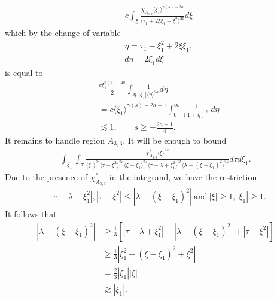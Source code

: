 \documentclass[12pt,reqno]{amsart}
\numberwithin{equation}{section}  %
\begin{document}
\begin{equation*}
\begin{split}
  &  c
  \int_{\xi} \frac{\chi_{A_{3,2}} \langle \xi_{1} \rangle ^{\gamma(s) -2a}}{\langle
  \tau_{1} + 2 \xi \xi_{1} - \xi_{1}^{2} \rangle^{2b}} d \xi
\end{split}
\end{equation*}
which by the change of variable
%
%
\begin{equation*}
\begin{split}
  & \eta = \tau_{1} - \xi_{1}^{2} + 2 \xi \xi_{1},
  \\
  & d \eta = 2 \xi_{1} d \xi
\end{split}
\end{equation*}
%
%
is equal to
%
%
\begin{equation*}
\begin{split}
  & \frac{c \xi_{1}^{\gamma(s) -2a}}{2}  \int_{\eta} 
  \frac{1}{| \xi_{1} |\langle \eta \rangle ^{2a}}d \eta
  \\
  & = c\langle \xi_{1} \rangle ^{\gamma(s) -2a -1} \int_{0}^{\infty} \frac{1}{(1 + \eta
  )^{2a}}d \eta
  \\
  & \lesssim 1, \qquad s \ge -\frac{2a+1}{4}.
\end{split}
\end{equation*}
It remains to handle region $A_{3,3}$. It will be enough to bound
%
%
\begin{equation}
  \label{region-A-2-3-star-split}
\begin{split}
   \int_{\xi_{1}} \int_{\tau} \frac{\chi^{*}_{A_{3,3}}
    \langle \xi \rangle ^{2s}
  }{\langle \xi_{1} \rangle^{2s} \langle  \tau  - \xi^{2}
    \rangle ^{2a}  \langle
\xi-\xi_{1} \rangle ^{2s}  \langle  \tau - \lambda+\xi_{1}^{2}
\rangle^{2b} \langle   \lambda  -(\xi - \xi_{1})^{2}
\rangle^{2b}} d \tau d \xi_{1}.
\end{split}
\end{equation}
%
Due to the presence of $\chi^{*}_{A_{3,3}}$ in the integrand, we have the restriction
%
%
\begin{equation*}
\begin{split}
& |\tau - \lambda +\xi_{1}^2|, | \tau - \xi^{2} | \le |  \lambda -
(\xi - \xi_{1})^{2} | \ \text{and} \  |\xi| \ge 1, |\xi_1| \ge 1.
\end{split}
\end{equation*}
%
It follows that
\begin{equation}
  \label{smoothing-2-3-case-6}
\begin{split}
  | \lambda - (\xi - \xi_{1})^{2} |
  & \ge \frac{1}{3}\left[ | \tau - \lambda + \xi_{1}^{2} | + | \lambda - (\xi - \xi_{1})^{2}
  | + | \tau - \xi^{2} | \right]
  \\
  & \ge \frac{1}{3} |  \xi_{1}^{2} - (\xi - \xi_{1})^{2} + \xi^{2} |
  \\
  & = \frac{2}{3} | \xi_{1} | | \xi |
  \\
  & \gtrsim | \xi_{1} |.
\end{split}
\end{equation}
\end{document}
